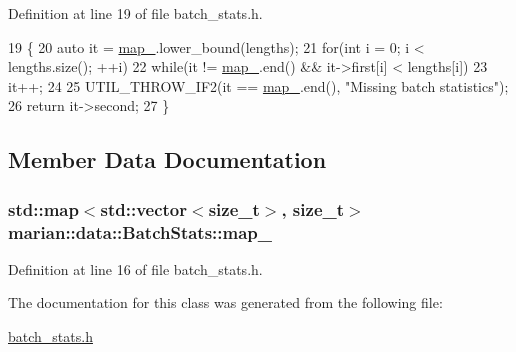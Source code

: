 Definition at line 19 of file batch\+\_\+stats.\+h.


\begin{DoxyCode}
19                                                         \{
20     \textcolor{keyword}{auto} it = \hyperlink{classmarian_1_1data_1_1BatchStats_aef18dc170f66ae7505328f1ccd12959b}{map\_}.lower\_bound(lengths);
21     \textcolor{keywordflow}{for}(\textcolor{keywordtype}{int} i = 0; i < lengths.size(); ++i)
22       \textcolor{keywordflow}{while}(it != \hyperlink{classmarian_1_1data_1_1BatchStats_aef18dc170f66ae7505328f1ccd12959b}{map\_}.end() && it->first[i] < lengths[i])
23         it++;
24 
25     UTIL\_THROW\_IF2(it == \hyperlink{classmarian_1_1data_1_1BatchStats_aef18dc170f66ae7505328f1ccd12959b}{map\_}.end(), \textcolor{stringliteral}{"Missing batch statistics"});
26     \textcolor{keywordflow}{return} it->second;
27   \}
\end{DoxyCode}


\subsection{Member Data Documentation}
\subsubsection[{\texorpdfstring{map\+\_\+}{map_}}]{\setlength{\rightskip}{0pt plus 5cm}std\+::map$<$std\+::vector$<$size\+\_\+t$>$, size\+\_\+t$>$ marian\+::data\+::\+Batch\+Stats\+::map\+\_\+\hspace{0.3cm}{\ttfamily [private]}}\hypertarget{classmarian_1_1data_1_1BatchStats_aef18dc170f66ae7505328f1ccd12959b}{}\label{classmarian_1_1data_1_1BatchStats_aef18dc170f66ae7505328f1ccd12959b}


Definition at line 16 of file batch\+\_\+stats.\+h.



The documentation for this class was generated from the following file\+:\begin{DoxyCompactItemize}
\item 
\hyperlink{batch__stats_8h}{batch\+\_\+stats.\+h}\end{DoxyCompactItemize}
